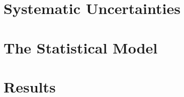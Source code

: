 \section{Systematic Uncertainties}
\label{sec:systematics}



\section{The Statistical Model}
\label{sec:stats-analysis}


\section{Results}
\label{sec:hww-results}

